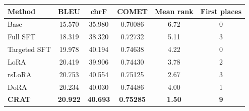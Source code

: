 \begingroup
\fontsize{7}{8.4}\selectfont
\setlength{\tabcolsep}{3pt}
\begin{tabular}{lccccc}
\toprule
\textbf{Method} & \textbf{BLEU} & \textbf{chrF} & \textbf{COMET} & \textbf{Mean rank} & \textbf{First places} \\
\midrule
Base & 15.570 & 35.980 & 0.70086 & 6.72 & 0 \\
Full SFT & 18.319 & 38.320 & 0.72732 & 5.11 & 3 \\
Targeted SFT & 19.978 & 40.194 & 0.74638 & 4.22 & 0 \\
LoRA & 20.419 & 39.906 & 0.74430 & 3.78 & 2 \\
rsLoRA & 20.753 & 40.554 & 0.75125 & 2.67 & 3 \\
DoRA & 20.234 & 40.030 & 0.74486 & 4.00 & 1 \\
\textbf{CRAT} & \textbf{20.922} & \textbf{40.693} & \textbf{0.75285} & \textbf{1.50} & \textbf{9} \\
\bottomrule
\end{tabular}
\endgroup
